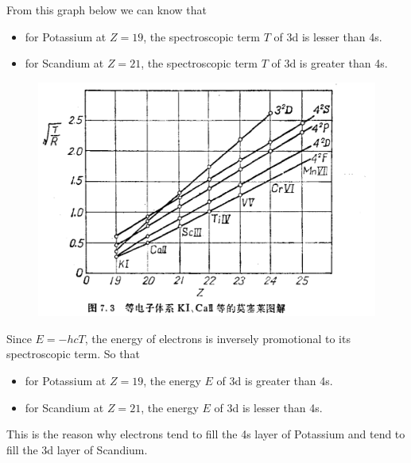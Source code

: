 \documentclass{article}
\begin{document}
From this graph below we can know that

\begin{itemize}
\item for Potassium at $Z = 19$, the spectroscopic term $T$ of 3d is lesser than 4s.
\item for Scandium at $Z = 21$, the spectroscopic term $T$ of 3d is greater than 4s.
\end{itemize}

\begin{figure}[H]
  \centering
  \includegraphics[width=\linewidth]{figures/Problem51}
  \label{fig:}
\end{figure}

Since $E = - h c T$, the energy of electrons is inversely promotional to its spectroscopic term. So that

\begin{itemize}
\item for Potassium at $Z = 19$, the energy $E$ of 3d is greater than 4s.
\item for Scandium at $Z = 21$, the energy $E$ of 3d is lesser than 4s.
\end{itemize}

This is the reason why electrons tend to fill the 4s layer of Potassium and tend to fill the 3d layer of Scandium.
\end{document}
